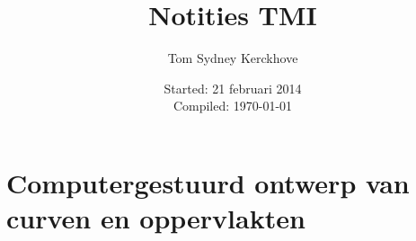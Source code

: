 \documentclass[10pt,a4paper,oneside]{book}
\author{Tom Sydney Kerckhove}
\title{Notities TMI}
\date{Started: 21 februari 2014\\ Compiled: \today}
\begin{document}

\tableofcontents


\part{Computergestuurd ontwerp van curven en oppervlakten}




\iffalse
\chapter{Modellering van oppervlakten}

\part{Algoritmen voor discrete meetkundige problemen}
\chapter{Inleiding}
\chapter{Algoritmen voor eenvoudige meetkundige problemen}
\chapter{Berekenen van de convex omhullende}
\chapter{Het dichtste puntenpaar en het verste puntenpaar}
\chapter{Het Voronoi-diagram van een puntenverzameling}
\chapter{Nabijheidsproblemen}
\chapter{Berekenen van het Voronoi-diagram}
\fi

\listoftodos
\end{document}
